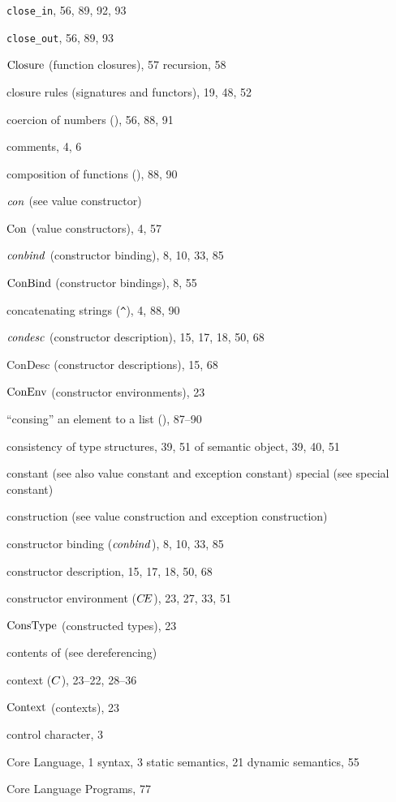 \begin{theindex}
\item \verb+close_in+, 56, 89, 92, 93
\item \verb+close_out+, 56, 89, 93
\item ${\rm Closure}$ (function closures), 57
\subitem recursion, 58
\item closure rules (signatures and functors), 19, 48, 52
\item coercion of numbers (), 56, 88, 91
\item comments, 4, 6
\item composition of functions (), 88, 90
\item ${\it con}$ (see value constructor) 
\item ${\rm Con}$ (value constructors), 4, 57
\item ${\it conbind}$ (constructor binding), 8, 10, 33, 85
\item ${\rm ConBind}$ (constructor bindings), 8, 55
\item concatenating strings (\verb+^+), 4, 88, 90
\item ${\it condesc}$ (constructor description), 15, 17, 18, 50, 68
\item ConDesc (constructor descriptions), 15, 68
\item ${\rm ConEnv}$ (constructor environments), 23
\item ``consing'' an element to a list (\ml{::}), 87--90
\item consistency 
\subitem of type structures, 39, 51
\subitem of semantic object, 39, 40, 51
\item constant (see also value constant and exception constant) 
\subitem special (see special constant) 
\item construction (see value construction and  exception construction) 
\item constructor binding (${\it conbind}$), 8, 10, 33, 85
\item constructor description, 15, 17, 18, 50, 68
\item constructor environment ($\mbox{$C\!E$}$), 23, 27, 33, 51
\item ${\rm ConsType}$ (constructed types), 23
\item contents of (see dereferencing) 
\item context ($C$), 23--22, 28--36
\item $\rm Context$ (contexts), 23
\item control character, 3
\item Core Language, 1
\subitem syntax, 3
\subitem static semantics, 21
\subitem dynamic semantics, 55
\item Core Language Programs, 77

\end{theindex}
